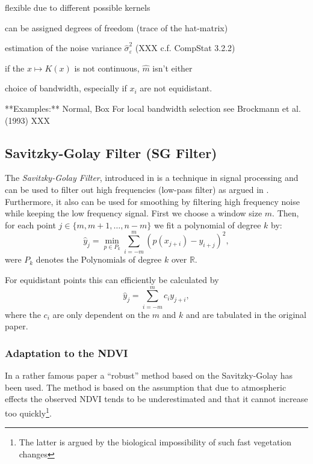 \begin{my_pros_cons_table}{
    \item flexible due to different possible kernels
    \item can be assigned degrees of freedom (trace of the hat-matrix)
    \item estimation of the noise variance $\hat \sigma_\varepsilon^2$ (XXX c.f. CompStat 3.2.2)
  }{
    \item if the $x \mapsto K(x)$ is not continuous, $\hat m $ isn't either
    \item choice of bandwidth, especially if $x_i$ are not equidistant.
  }
\end{my_pros_cons_table}


**Examples:**
Normal, Box
For local bandwidth selection see Brockmann et al. (1993) XXX



\subsection{Savitzky-Golay Filter (SG Filter)}
\label{sec:Savitzky–Golay}
The \textit{Savitzky-Golay Filter}, introduced in \cite{savitzkySmoothingDifferentiationData1964} is a technique in signal processing and can be used to filter out high frequencies (low-pass filter) as argued in \cite{schaferWhatSavitzkyGolayFilter2011}. Furthermore, it also can be used for smoothing by filtering high frequency noise while keeping the low frequency signal.
First we choose a window size $m$. Then, for each point $j \in \{m, m+1, \dots, n-m\}$ we fit a polynomial of degree $k$ by:
$$\hat y_j=\min_{p\in P_k}\sum_{i=-m}^{m}(p (x_{j+i})-y_{i+j})^{2},$$
were $P_k$ denotes the Polynomials of degree $k$ over $\mathbb R$.

For equidistant points this can efficiently be calculated by
$$
  \hat y_{j}=\sum_{i=-m}^{m} c_{i} y_{j+i},
$$
where the $c_i$ are only dependent on the $m$ and $k$ and are tabulated in the original paper.

\subsubsection*{Adaptation to the NDVI}
In a rather famous paper \cite{chenSimpleMethodReconstructing2004a} a ``robust'' method based on the Savitzky-Golay has been used.
The method is based on the assumption that due to atmospheric effects the observed NDVI tends to be underestimated and that it cannot increase too quickly\footnote{The latter is argued by the biological impossibility of such fast vegetation changes}.

